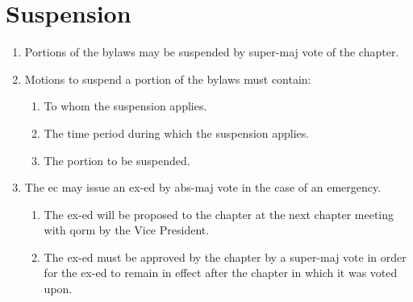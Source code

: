 \section{Suspension}
\label{suspend-bylaws}
	\begin{enumerate}
		\item Portions of the bylaws may be suspended by \gls{super-maj} vote of the chapter.
		\item Motions to suspend a portion of the bylaws must contain:
			\begin{enumerate}
				\item To whom the suspension applies.
				\item The time period during which the suspension applies.
				\item The portion to be suspended.
			\end{enumerate}
		\item The \gls{ec} may issue an \gls{ex-ed} by \gls{abs-maj} vote in the case of an emergency. \label{executive-edict}
			\begin{enumerate}
				\item The \gls{ex-ed} will be proposed to the chapter at the next chapter meeting with \gls{qorm} by the Vice President.
				\item The \gls{ex-ed} must be approved by the chapter by a \gls{super-maj} vote in order for the
\gls{ex-ed} to remain in effect after the chapter in which it was voted upon. 
			\end{enumerate}
	\end{enumerate}

